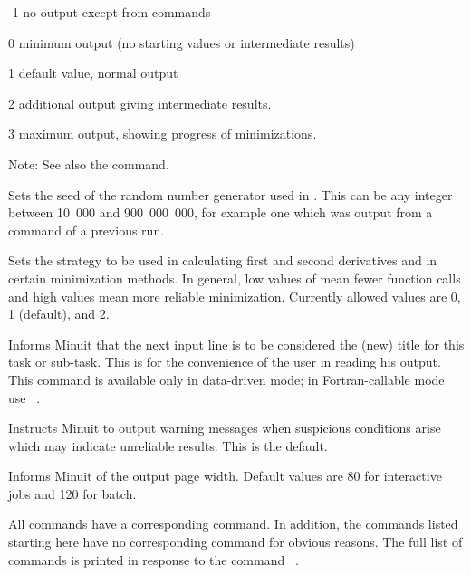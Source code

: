 \begin{DLtt}{12}
\item[-1]            no output except from  commands
\item[\phantom{-}0]  minimum output (no starting values or intermediate results)
\item[\phantom{-}1]  default value, normal output
\item[\phantom{-}2]  additional output giving intermediate results.
\item[\phantom{-}3]  maximum output, showing progress of minimizations.
\end{DLtt}
 
Note: See also the  command.


Sets the seed of the random number generator used in .  
This can be any integer between 10~000 and 900~000~000, for example
one which was output from a  command of a previous run.


Sets the strategy to be used in calculating first and second derivatives
and in certain minimization methods. In general, low values of 
mean fewer function calls and high values mean more reliable minimization.
Currently allowed values are 0, 1 (default), and 2.


Informs Minuit that the next input line is to be considered the (new)
title for this task or sub-task.  This is for the convenience of
the user in reading his output. This command is available only in data-driven
mode; in Fortran-callable mode use ~.


Instructs Minuit to output warning messages when suspicious conditions
arise which may indicate unreliable results.
This is the default.

Informs Minuit of the output page width. Default values are 80 for
interactive jobs and 120 for batch.


All  commands have a corresponding  command.
In addition, the  commands listed starting here have no corresponding
 command for obvious reasons.  The full list of  commands
is printed in response to the command ~.

